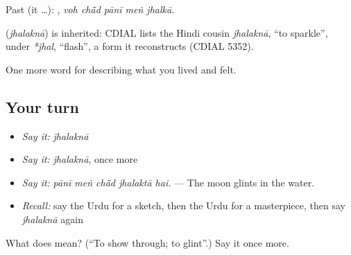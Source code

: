Past (it …):     , \emph{voh chā̃d pānī meṅ jhalkā}.

\begin{cousinweb}
\textbf{} (\emph{jhalaknā}) is inherited: CDIAL lists the Hindi cousin \emph{jhalaknā}, \textquotedblleft{}to sparkle\textquotedblright{}, under \emph{*jhal}, \textquotedblleft{}flash\textquotedblright{}, a form it reconstructs (CDIAL 5352).
\end{cousinweb}

\begin{grammarlens}[title={What you've built}]
One more word for describing what you lived and felt.
\end{grammarlens}

\subsection*{Your turn}
\begin{itemize}
\raggedright
  \item \emph{Say it:} \emph{jhalaknā}
  \item \emph{Say it:} \emph{jhalaknā}, once more
  \item \emph{Say it:} \emph{pānī meṅ chā̃d jhalaktā hai.} — The moon glints in the water.
  \item \emph{Recall:} say the Urdu for a sketch, then the Urdu for a masterpiece, then say \emph{jhalaknā} again
\end{itemize}

\begin{tcolorbox}[breakable,colback=teal!4,colframe=teal!35!black,title={Before you move on}]
What does  mean? (\textquotedblleft{}To show through; to glint\textquotedblright{}.) Say it once more.
\end{tcolorbox}

